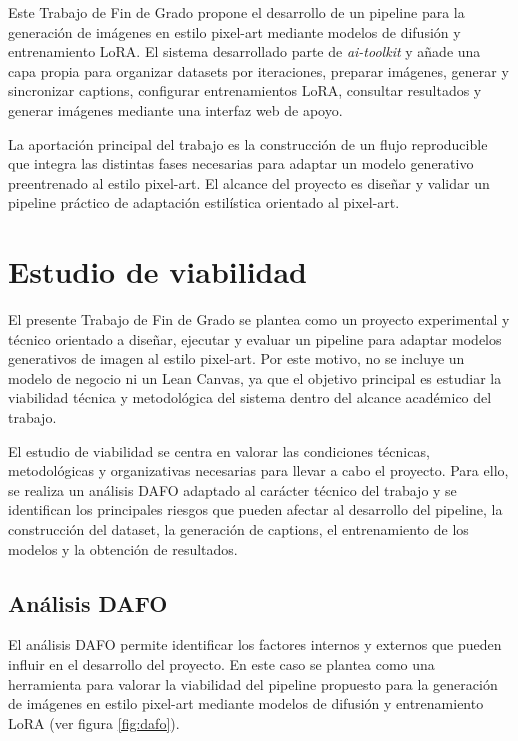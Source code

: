 \documentclass[a4paper,11pt,titlepage]{scrbook}
\begin{document}
\medskip

Este Trabajo de Fin de Grado propone el desarrollo de un pipeline para la generación de imágenes en estilo pixel-art mediante modelos de difusión y entrenamiento LoRA. El sistema desarrollado parte de \textit{ai-toolkit} y añade una capa propia para organizar datasets por iteraciones, preparar imágenes, generar y sincronizar captions, configurar entrenamientos LoRA, consultar resultados y generar imágenes mediante una interfaz web de apoyo.

\medskip

La aportación principal del trabajo es la construcción de un flujo reproducible que integra las distintas fases necesarias para adaptar un modelo generativo preentrenado al estilo pixel-art. El alcance del proyecto es diseñar y validar un pipeline práctico de adaptación estilística orientado al pixel-art.


\chapter{Estudio de viabilidad} \label{viabilidad}

El presente Trabajo de Fin de Grado se plantea  como un proyecto experimental y técnico orientado a diseñar, ejecutar y evaluar un pipeline para adaptar modelos generativos de imagen al estilo pixel-art. Por este motivo, no se incluye un modelo de negocio ni un Lean Canvas, ya que el objetivo principal es estudiar la viabilidad técnica y metodológica del sistema dentro del alcance académico del trabajo. 

\medskip 

El estudio de viabilidad se centra en valorar las condiciones técnicas, metodológicas y organizativas necesarias para llevar a cabo el proyecto. Para ello, se realiza un análisis DAFO adaptado al carácter técnico del trabajo y se identifican los principales riesgos que pueden afectar al desarrollo del pipeline, la construcción del dataset, la generación de captions, el entrenamiento de los modelos y la obtención de resultados.

\section{Análisis DAFO}

El análisis DAFO permite identificar los factores internos y externos que pueden influir en el desarrollo del proyecto. En este caso se plantea como una herramienta para valorar la viabilidad del pipeline propuesto para la generación de imágenes en estilo pixel-art mediante modelos de difusión y entrenamiento LoRA (ver figura \ref{fig:dafo}).
\end{document}
